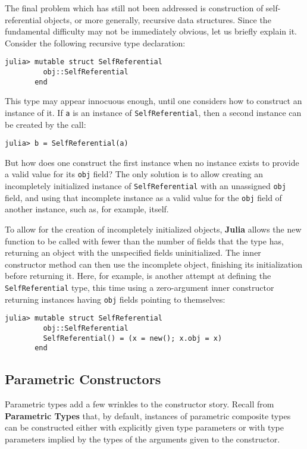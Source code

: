 \documentclass[
]{article}
\begin{document}
The final problem which has still not been addressed is construction of
self-referential objects, or more generally, recursive data structures.
Since the fundamental difficulty may not be immediately obvious, let us
briefly explain it. Consider the following recursive type declaration:

\begin{verbatim}
julia> mutable struct SelfReferential
         obj::SelfReferential
       end
\end{verbatim}

This type may appear innocuous enough, until one considers how to
construct an instance of it. If \texttt{a} is an instance of
\texttt{SelfReferential}, then a second instance can be created by the
call:

\begin{verbatim}
julia> b = SelfReferential(a)
\end{verbatim}

But how does one construct the first instance when no instance exists to
provide a valid value for its \texttt{obj} field? The only solution is
to allow creating an incompletely initialized instance of
\texttt{SelfReferential} with an unassigned \texttt{obj} field, and
using that incomplete instance as a valid value for the \texttt{obj}
field of another instance, such as, for example, itself.

To allow for the creation of incompletely initialized objects,
\textbf{Julia} allows the new function to be called with fewer than the
number of fields that the type has, returning an object with the
unspecified fields uninitialized. The inner constructor method can then
use the incomplete object, finishing its initialization before returning
it. Here, for example, is another attempt at defining the
\texttt{SelfReferential} type, this time using a zero-argument inner
constructor returning instances having \texttt{obj} fields pointing to
themselves:

\begin{verbatim}
julia> mutable struct SelfReferential
         obj::SelfReferential
         SelfReferential() = (x = new(); x.obj = x)
       end
\end{verbatim}

\hypertarget{parametric-constructors}{%
\subsection{Parametric Constructors}\label{parametric-constructors}}

Parametric types add a few wrinkles to the constructor story. Recall
from \textbf{Parametric Types} that, by default, instances of parametric
composite types can be constructed either with explicitly given type
parameters or with type parameters implied by the types of the arguments
given to the constructor.
\end{document}
